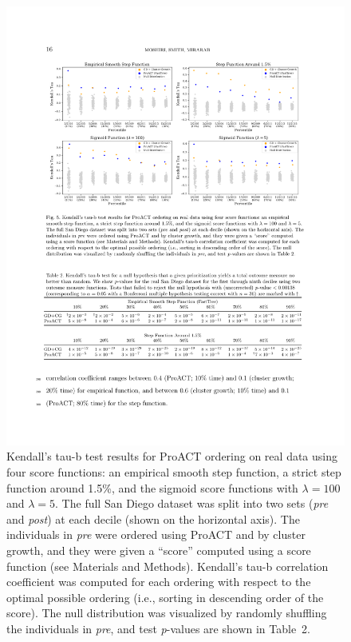 \documentclass[oupdraft]{sysbio}
\begin{document}
\begin{figure}[t]
\centering
\includegraphics[width=\textwidth]{Fig5.pdf}
\caption{Kendall's tau-b test results for ProACT ordering on real data using four  score functions: an empirical smooth step function, a strict step function around 1.5\%, and the sigmoid  score functions with $\lambda=100$ and $\lambda=5$. The full San Diego dataset was split into two sets (\textit{pre} and \textit{post}) at each decile (shown on the horizontal axis). The individuals in \textit{pre} were ordered using ProACT and by cluster growth, and they were given a  ``score'' computed using a  score function (see Materials and Methods). Kendall's tau-b correlation coefficient was computed for each ordering with respect to the optimal possible ordering (i.e., sorting in descending order of the  score). The null distribution was visualized by randomly shuffling the individuals in \textit{pre}, and test \textit{p}-values are shown in Table~2.}
\label{fig:tautest}\label{fig:tautest-sup}
\end{figure}
\end{document}
